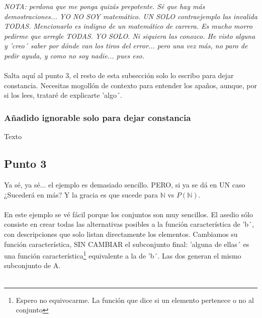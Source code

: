 	\noindent
	\textit{NOTA: perdona que me ponga quizás prepotente. Sé que hay más demostraciones... YO NO SOY matemático. UN SOLO contraejemplo las invalida TODAS. Mencionarlo es indigno de un matemático de carrera. Es mucho morro pedirme que arregle TODAS. YO SOLO. Ni siquiera las conozco. He visto alguna y 'creo´ saber por dónde van los tiros del error... pero una vez más, no paro de pedir ayuda, y como no soy nadie... pues eso.}\\\\
	
	\noindent
	Salta aquí al punto 3, el resto de esta subsección solo lo escribo para dejar constancia. Necesitas mogollón de contexto para entender los apaños, aunque, por si los lees, trataré de explicarte 'algo´.
	
	\subsubsection{Añadido ignorable solo para dejar constancia}
	
	Texto
	
	\subsection{Punto 3}
	
	\noindent
	Ya sé, ya sé... el ejemplo es demasiado sencillo. PERO, si ya se dá en UN caso ¿Sucederá en más? Y la gracia es que sucede para $\mathbb{N}$ vs $P(\mathbb{N})$.\\\\ 
	
	\noindent
	En este ejemplo se vé fácil porque los conjuntos son muy sencillos. El asedio sólo consiste en crear todas las alternativas posibles a la función característica de 'b´, con descripciones que solo listan directamente los elementos. Cambiamos su función característica, SIN CAMBIAR el subconjunto final: 'alguna de ellas´ es una función característica\footnote{Espero no equivocarme. La función que dice si un elemento pertenece o no al conjunto} equivalente a la de 'b´. Las dos generan el mismo subconjunto de A.\\\\
	
